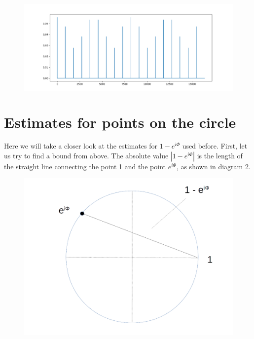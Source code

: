 \documentclass[a4paper, draft]{article}
\theoremstyle{own}
\theoremstyle{remark}
\begin{document}
\begin{figure}[ht]
\centering
\includegraphics[width=1.0\linewidth]{images/ShorSampleII}
\caption[Sample for M = 95]{}
\label{fig:ShorSampleII}
\end{figure}



\appendix
	
\section{Estimates for points on the circle}

Here we will take a closer look at the estimates for $1 - e^{i\Phi}$ used before. First, let us try to find a bound from above. The absolute value $| 1 - e^{i\Phi}|$ is the length of the straight line connecting the point 1 and the point $e^{i\Phi}$, as shown in diagram \ref{fig:LineSegments}.

\begin{figure}[ht]
\centering
\includegraphics[width=1.0\linewidth]{images/LineSegments}
\caption[Estimates on the unit circle]{}
\label{fig:LineSegments}
\end{figure}
\end{document}
